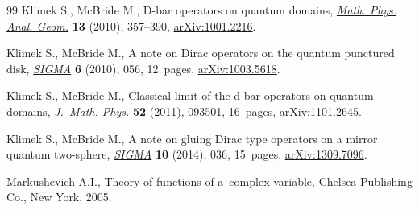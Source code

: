 \documentclass[pdftex]{sigma}
\numberwithin{equation}{section}
\begin{document}
\begin{thebibliography}{99}
Klimek S., McBride M., D-bar operators on quantum domains, \href{http://dx.doi.org/10.1007/s11040-010-9084-9}{\textit{Math. Phys.
  Anal. Geom.}} \textbf{13} (2010), 357--390, \href{http://arxiv.org/abs/1001.2216}{arXiv:1001.2216}.

Klimek S., McBride M., A note on {D}irac operators on the quantum punctured
  disk, \href{http://dx.doi.org/10.3842/SIGMA.2010.056}{\textit{SIGMA}} \textbf{6} (2010), 056, 12~pages, \href{http://arxiv.org/abs/1003.5618}{arXiv:1003.5618}.

Klimek S., McBride M., Classical limit of the d-bar operators on quantum
  domains, \href{http://dx.doi.org/10.1063/1.3633525}{\textit{J.~Math. Phys.}} \textbf{52} (2011), 093501, 16~pages,
  \href{http://arxiv.org/abs/1101.2645}{arXiv:1101.2645}.

Klimek S., McBride M., A note on gluing {D}irac type operators on a mirror
  quantum two-sphere, \href{http://dx.doi.org/10.3842/SIGMA.2014.036}{\textit{SIGMA}} \textbf{10} (2014), 036, 15~pages,
  \href{http://arxiv.org/abs/1309.7096}{arXiv:1309.7096}.

Markushevich A.I., Theory of functions of a~complex variable, Chelsea
  Publishing Co., New York, 2005.

\end{thebibliography}\LastPageEnding
\end{document}
